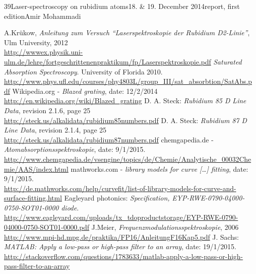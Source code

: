 \documentclass[a4paper, parskip=half, 12pt, bibliography=totocnumbered]{scrartcl}
\begin{document}
{39}{Laser-spectroscopy on rubidium atoms}{18. \& 19. December 2014}{report, first edition}{Amir Mohammadi}{}





\begin{thebibliography}{10}
 A.Krükow, \emph{Anleitung zum Versuch ``Laserspektroskopie der Rubidium D2-Linie''}, Ulm University, 2012\\
\url{http://wwwex.physik.uni-ulm.de/lehre/fortgeschrittenenpraktikum/fp/Laserspektroskopie.pdf}
 \emph{Saturated Absorption Spectroscopy}. University of Florida 2010.\\
\url{http://www.phys.ufl.edu/courses/phy4803L/group_III/sat_absorbtion/SatAbs.pdf}
 Wikipedia.org - \emph{Blazed grating}, date: 12/2/2014\\
\url{http://en.wikipedia.org/wiki/Blazed_grating}
 D. A. Steck: \emph{Rubidium 85 D Line Data}, revision 2.1.6, page 25\\
\url{http://steck.us/alkalidata/rubidium85numbers.pdf}
 D. A. Steck: \emph{Rubidium 87 D Line Data}, revision 2.1.4, page 25\\
\url{http://steck.us/alkalidata/rubidium87numbers.pdf}
 chemgapedia.de - \emph{Atomabsorptionsspektroskopie}, date: 9/1/2015.\\
\url{http://www.chemgapedia.de/vsengine/topics/de/Chemie/Analytische_00032Chemie/AAS/index.html}
 mathworks.com - \emph{library models for curve [\dots] fitting}, date: 9/1/2015.\\
\url{http://de.mathworks.com/help/curvefit/list-of-library-models-for-curve-and-surface-fitting.html}
 Eagleyard photonics: \emph{Specification, EYP-RWE-0790-04000-0750-SOT01-0000 diode}.\\
\url{http://www.eagleyard.com/uploads/tx_tdoproductstorage/EYP-RWE-0790-04000-0750-SOT01-0000.pdf}
 J.Meier, \emph{Frequenzmodulationsspektroskopie}, 2006\\
\url{http://www.mpi-hd.mpg.de/praktika/FP16/AnleitungF16Kap5.pdf}
 J. Sachs: \emph{MATLAB: Apply a low-pass or high-pass filter to an array}, date: 19/1/2015.\\
\url{http://stackoverflow.com/questions/1783633/matlab-apply-a-low-pass-or-high-pass-filter-to-an-array}
\end{thebibliography}
\end{document}
